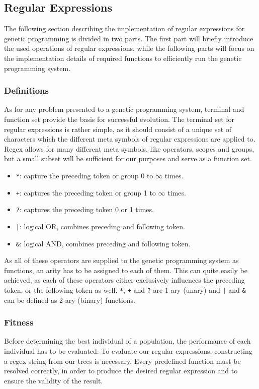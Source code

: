 \documentclass[runningheads]{llncs}
\begin{document}
\subsection{Regular Expressions}
The following section describing the implementation of regular expressions for genetic programming is divided in two parts. The first part will briefly introduce the used operations of regular expressions, while the following parts will focus on the implementation details of required functions to efficiently run the genetic programming system.

\subsubsection{Definitions}
As for any problem presented to a genetic programming system, terminal and function set provide the basis for successful evolution. The terminal set for regular expressions is rather simple, as it should consist of a unique set of characters which the different meta symbols of regular expressions are applied to. Regex allows for many different meta symbols, like operators, scopes and groups, but a small subset will be sufficient for our purposes and serve as a function set.
\begin{itemize}
\item \texttt{*}: capture the preceding token or group 0 to $\infty$ times.
\item \texttt{+}: captures the preceding token or group 1 to $\infty$ times.
\item \texttt{?}: captures the preceding token 0 or 1 times.
\item \texttt{|}: logical OR, combines preceding and following token.
\item \texttt{\&}: logical AND, combines preceding and following token.
\end{itemize}

As all of these operators are supplied to the genetic programming system as functions, an arity has to be assigned to each of them. This can quite easily be achieved, as each of these operators either exclusively influences the preceding token, or the following token as well. \texttt{*}, \texttt{+} and \texttt{?} are 1-ary (unary) and \texttt{|} and \texttt{\&} can be defined as 2-ary (binary) functions.

\subsubsection{Fitness}
Before determining the best individual of a population, the performance of each individual has to be evaluated. To evaluate our regular expressions, constructing a regex string from our trees is necessary. Every predefined function must be resolved correctly, in order to produce the desired regular expression and to ensure the validity of the result.
\end{document}
